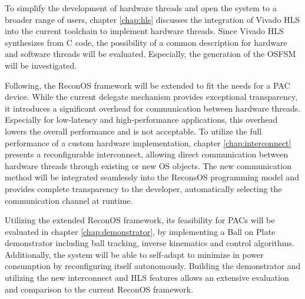 To simplify the development of hardware threads and open the system to a
broader range of users, chapter \ref{chap:hls} discusses the integration of
Vivado HLS into the current toolchain to implement hardware threads. Since
Vivado HLS synthesizes from C code, the possibility of a common description
for hardware and software threads will be evaluated. Especially, the
generation of the \ac{OSFSM} will be investigated.

Following, the ReconOS framework will be extended to fit the needs for a
\ac{PAC} device. While the current delegate mechanism provides exceptional
transparency, it introduces a significant overhead for communication between
hardware threads. Especially for low-latency and high-performance
applications, this overhead lowers the overall performance and is not
acceptable. To utilize the full performance of a custom hardware
implementation, chapter \ref{chap:interconnect} presents a reconfigurable
interconnect, allowing direct communication between hardware threads through
existing or new \ac{OS} objects. The new communication method will be
integrated seamlessly into the ReconsOS programming model and provides
complete transparency to the developer, automatically selecting the
communication channel at runtime.

Utilizing the extended ReconOS framework, its feasibility for \acp{PAC} will
be evaluated in chapter \ref{chap:demonstrator}, by implementing a Ball on
Plate demonstrator including ball tracking, inverse kinematics and control
algorithms. Additionally, the system will be able to self-adapt to minimize in
power consumption by reconfiguring itself autonomously. Building the
demonstrator and utilizing the new interconnect and \ac{HLS} features allows
an extensive evaluation and comparison to the current ReconOS framework.